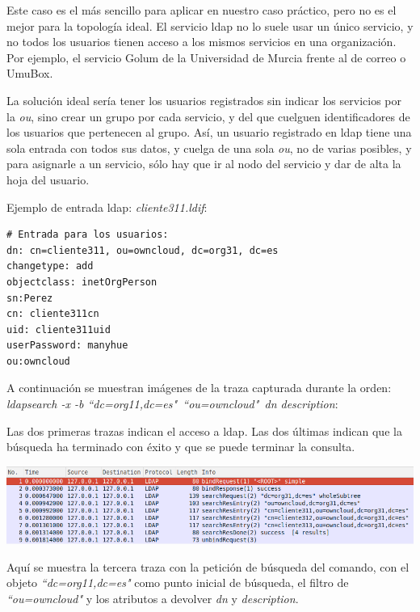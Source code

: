 \documentclass[]{article}
\begin{document}
Este caso es el más sencillo para aplicar en nuestro caso práctico, pero no es el mejor para la topología ideal. El servicio ldap no lo suele usar un único servicio, y no todos los usuarios tienen acceso a los mismos servicios en una organización. Por ejemplo, el servicio Golum de la Universidad de Murcia frente al de correo o UmuBox.

La solución ideal sería tener los usuarios registrados sin indicar los servicios por la \textit{ou}, sino crear un grupo por cada servicio, y del que cuelguen identificadores de los usuarios que pertenecen al grupo. Así, un usuario registrado en ldap tiene una sola entrada con todos sus datos, y cuelga de una sola \textit{ou}, no de varias posibles, y para asignarle a un servicio, sólo hay que ir al nodo del servicio y dar de alta la hoja del usuario.

Ejemplo de entrada ldap: \textit{cliente311.ldif}:

\begin{BVerbatim}
# Entrada para los usuarios:
dn: cn=cliente311, ou=owncloud, dc=org31, dc=es
changetype: add
objectclass: inetOrgPerson
sn:Perez
cn: cliente311cn
uid: cliente311uid
userPassword: manyhue
ou:owncloud
\end{BVerbatim}

A continuación se muestran imágenes de la traza capturada durante la orden: \textit{ldapsearch -x -b “dc=org11,dc=es"\ “ou=owncloud"\ dn description}:

Las dos primeras trazas indican el acceso a ldap. Las dos últimas indican que la búsqueda ha terminado con éxito y que se puede terminar la consulta.

\begin{center}
\includegraphics[scale=0.5]{images/ldap/ldap1}
\end{center}

Aquí se muestra la tercera traza con la petición de búsqueda del comando, con el objeto \textit{“dc=org11,dc=es"} como punto inicial de búsqueda, el filtro de \textit{“ou=owncloud"} y los atributos a devolver \textit{dn} y \textit{description}.
\end{document}
